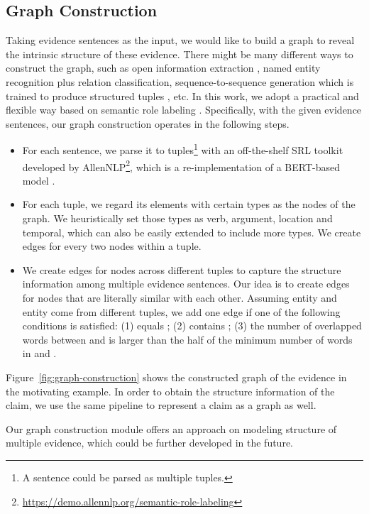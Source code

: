 \documentclass[11pt,a4paper]{article}
\begin{document}
\subsection{Graph Construction}
\label{section:graph-construction}
Taking evidence sentences as the input, we would like to build a graph to reveal the intrinsic structure of these evidence.
There might be many different ways to construct the graph, such as open information extraction \cite{banko2007open}, named entity recognition plus relation classification, sequence-to-sequence generation which is trained to produce structured tuples \cite{goodrich2019assessing}, etc. 
In this work, we adopt a practical and flexible way based on semantic role labeling \cite{carreras2004introduction}. 
Specifically, with the given evidence sentences, our graph construction operates in the following steps. 
\begin{itemize}
	\item 
	For each sentence, we parse it to tuples\footnote{A sentence could be parsed as multiple tuples.} with an off-the-shelf SRL toolkit developed by AllenNLP\footnote{\url{https://demo.allennlp.org/semantic-role-labeling}}, which is a re-implementation of a BERT-based model \cite{shi2019simple}.
\item For each tuple, we regard its elements with certain types as the nodes of the graph.
We heuristically set those types as verb, argument, location and temporal, which can also be easily extended to include more types.
We create edges for every two nodes within a tuple.
\item We create edges for nodes across different tuples to capture the structure information among multiple evidence sentences.
	Our idea is to create edges for nodes that are literally similar with each other.
Assuming entity  and entity  come from different tuples,  we add one edge if one of the following conditions is satisfied: (1)  equals ; (2)  contains ; (3) the number of overlapped words between  and  is larger than the half of the minimum number of words in  and .
\end{itemize}
Figure~\ref{fig:graph-construction} shows the constructed graph of the evidence in the motivating example.
In order to obtain the structure information of the claim, we use the same pipeline to represent a claim as a graph as well.

Our graph construction module offers an approach on modeling structure of multiple evidence, which could be further developed in the future.
\end{document}
